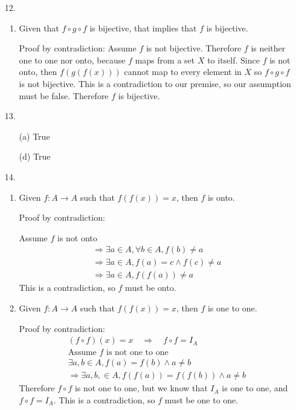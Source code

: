 \documentclass[fleqn]{article}
\begin{document}
\begin{enumerate}
	\item[12.]
	\begin{enumerate}
		\item %
		Given that \(f \circ g \circ f\) is bijective, that implies that \(f\) is bijective.

		Proof by contradiction: Assume \(f\) is not bijective. Therefore \(f\) is neither one to one nor onto, because \(f\) maps from a set \(X\) to itself. Since \(f\) is not onto, then \(f(g(f(x)))\) cannot map to every element in \(X\) so \(f \circ g \circ f\) is not bijective. This is a contradiction to our premise, so our assumption must be false. Therefore \(f\) is bijective.
	\end{enumerate}

	\item[13.]
	\begin{enumerate}
		\item[(a)]
		True
		
		\item[(d)]
		True
	\end{enumerate}

	\item[14.]
	\begin{enumerate}
		\item %
		Given \(f:A \to A\) such that \(f(f(x)) = x\), then \(f\) is onto.
		
		Proof by contradiction:
		
		Assume \(f\) is not onto
		\begin{gather*}
			\Rightarrow \exists a \in A, \forall b \in A, f(b) \neq a \\
			\Rightarrow \exists a \in A, f(a) = c \land f(c) \neq a \\
			\Rightarrow \exists a \in A, f(f(a)) \neq a
		\end{gather*}
		This is a contradiction, so \(f\) must be onto.
		
		\item %
		Given \(f:A \to A\) such that \(f(f(x)) = x\), then \(f\) is one to one.

		Proof by contradiction:
		\begin{gather*}
			(f \circ f)(x) = x \quad \Rightarrow \quad f \circ f = I_A \\
			\text{Assume \(f\) is not one to one} \\
			\exists a, b \in A, f(a) = f(b) \land a \neq b \\
			\Rightarrow \exists a, b, \in A, f(f(a)) = f(f(b)) \land a \neq b
		\end{gather*}
		Therefore \(f \circ f\) is not one to one, but we know that \(I_A\) is one to one, and \(f \circ f = I_A\). This is a contradiction, so \(f\) must be one to one.
		

\end{enumerate}
\end{enumerate}
\end{document}
